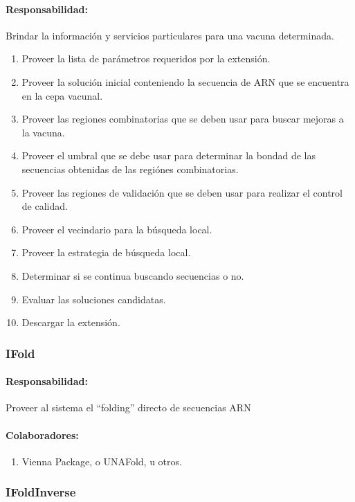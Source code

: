     \paragraph{Responsabilidad:} Brindar la informaci\'on y servicios
particulares para una vacuna determinada.    
      \begin{enumerate}
       \item Proveer la lista de par\'ametros requeridos por la extensi\'on.
       \item Proveer la soluci\'on inicial conteniendo la secuencia de ARN que
se encuentra en la cepa vacunal.
       \item Proveer las regiones combinatorias que se deben usar para buscar
mejoras a la vacuna.
       \item Proveer el umbral que se debe usar para determinar la bondad de las
secuencias obtenidas de las regi\'ones combinatorias.
       \item Proveer las regiones de validaci\'on que se deben usar para
realizar el control de calidad.       
       \item Proveer el vecindario para la b\'usqueda local.
       \item Proveer la estrategia de b\'usqueda local.
       \item Determinar si se continua buscando secuencias o no.
       \item Evaluar las soluciones candidatas.
       \item Descargar la extensi\'on.
      \end{enumerate}

  \subsubsection{IFold}
    \paragraph{Responsabilidad:} Proveer al sistema el ``folding'' directo de
secuencias ARN
    \paragraph{Colaboradores:}
      \begin{enumerate}
       \item Vienna Package, o UNAFold, u otros.
      \end{enumerate}

  \subsubsection{IFoldInverse}
